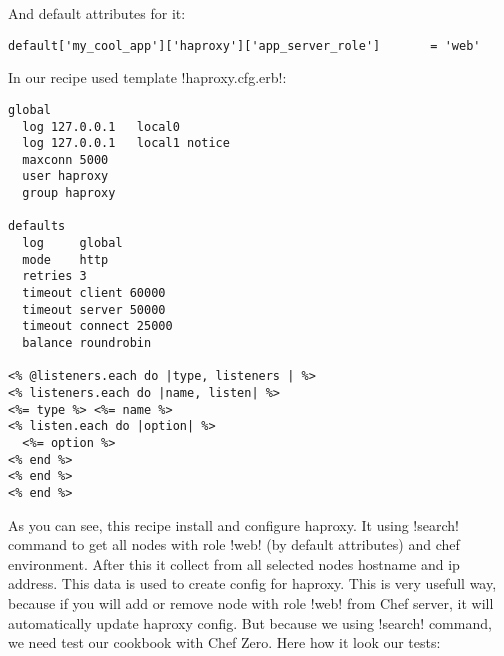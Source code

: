And default attributes for it:

\begin{lstlisting}[label=lst:testing-chef-zero13]
default['my_cool_app']['haproxy']['app_server_role']       = 'web'
\end{lstlisting}

In our recipe used template \inline!haproxy.cfg.erb!:

\begin{lstlisting}[label=lst:testing-chef-zero14]
global
  log 127.0.0.1   local0
  log 127.0.0.1   local1 notice
  maxconn 5000
  user haproxy
  group haproxy

defaults
  log     global
  mode    http
  retries 3
  timeout client 60000
  timeout server 50000
  timeout connect 25000
  balance roundrobin

<% @listeners.each do |type, listeners | %>
<% listeners.each do |name, listen| %>
<%= type %> <%= name %>
<% listen.each do |option| %>
  <%= option %>
<% end %>
<% end %>
<% end %>
\end{lstlisting}

As you can see, this recipe install and configure haproxy. It using \inline!search! command to get all nodes with role \inline!web! (by default attributes) and chef environment. After this it collect from all selected nodes hostname and ip address. This data is used to create config for haproxy. This is very usefull way, because if you will add or remove node with role \inline!web! from Chef server, it will automatically update haproxy config. But because we using \inline!search! command, we need test our cookbook with Chef Zero. Here how it look our tests:

